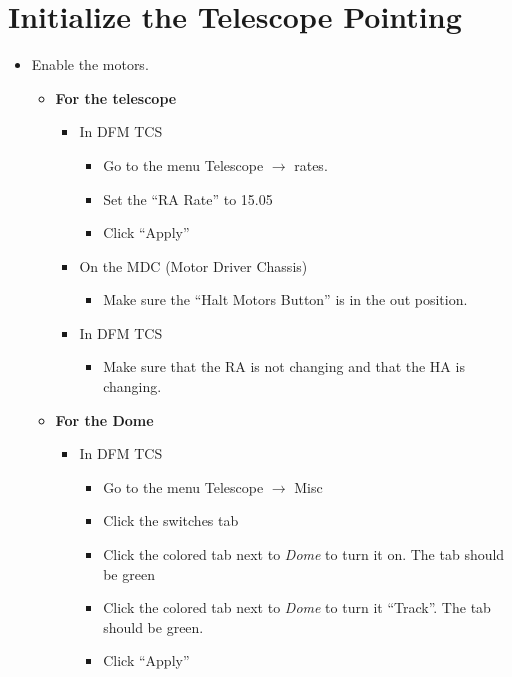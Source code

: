 \documentclass[letterpaper, 12pt]{report}
\begin{document}
\section{Initialize the Telescope Pointing}
\begin{itemize}
	\item Enable the motors.
		\begin{itemize}
			\item \textbf{For the telescope}
			\begin{itemize}
				\item In DFM TCS
				\begin{itemize}
					\item Go to the menu Telescope $\rightarrow$ rates.
					\item Set the ``RA Rate'' to 15.05
					\item Click ``Apply''
				\end{itemize}
				\item On the MDC (Motor Driver Chassis)
				\begin{itemize}
					\item Make sure the ``Halt Motors Button'' is in the out position.
				\end{itemize}
				\end{itemize}
				\begin{itemize}
					\item In DFM TCS
					\begin{itemize}
						\item Make sure that the RA is not changing and that the HA is changing.
					\end{itemize}
				\end{itemize}
				\end{itemize}
				\begin{itemize}
					\item \textbf{For the Dome}
					\begin{itemize}
						\item In DFM TCS
						\begin{itemize}
							\item Go to the menu Telescope $\rightarrow$ Misc
							\item Click the switches tab
							\item Click the colored tab next to \emph{Dome} to turn it on. The tab should be green
							\item Click the colored tab next to \emph{Dome} to turn it ``Track''. The tab should be green.
							\item Click ``Apply''

\end{itemize}
\end{itemize}
\end{itemize}
\end{itemize}
\end{document}
